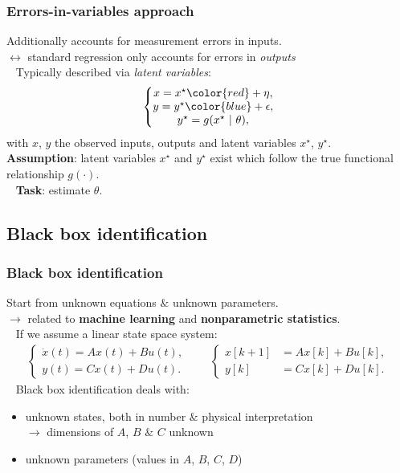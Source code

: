 \documentclass{beamer}
\begin{document}
\begin{frame}
\frametitle{Errors-in-variables approach}
Additionally accounts for {\color{red}measurement errors in inputs}.\\
$\leftrightarrow$ standard regression only accounts for {\color{blue}errors in \emph{outputs}} \\
\ \newline
\pause
Typically described via \emph{latent variables}:
\begin{align*}
\left\{ \begin{matrix}
x = x^\star {\color{red}+ \eta}, \\
y = y^\star {\color{blue}+ \epsilon}, \\
y^\star = g(x^\star\ |\ \theta),
\end{matrix}\right.
\end{align*}
with $x$, $y$ the observed inputs, outputs and latent variables $x^\star$, $y^\star$.\\
\pause
\textbf{Assumption}: latent variables $x^\star$ and $y^\star$ exist which follow the true functional relationship $g(\cdot)$.\\
\ \newline
\pause
\textbf{Task}: estimate $\theta$.
\end{frame}



\subsection{Black box identification}
\begin{frame}
\frametitle{Black box identification}
Start from unknown equations $\&$ unknown parameters. \\
$\rightarrow$ related to \textbf{machine learning} and \textbf{nonparametric statistics}. \\
\pause
\ \newline
If we assume a linear state space system:
\begin{align*}
\left\{ \begin{matrix} 
\dot{x}(t) = A x(t) + B u(t), \\ 
y(t) = C x(t) + D u(t).
\end{matrix}\right.\quad\quad
\left\{ \begin{matrix} 
x[k+1] &= A x[k] + B u[k], \\ 
y[k] &= C x[k] + D u[k].
\end{matrix}\right.
\end{align*}
\pause
\ \newline
Black box identification deals with:
\pause
\begin{itemize}
\item unknown states, both in number $\&$ physical interpretation \\
\pause
$\rightarrow$ dimensions of $A$, $B$ $\&$ $C$ unknown
\pause
\item unknown parameters (values in $A$, $B$, $C$, $D$)
\end{itemize}
\end{frame}
\end{document}
